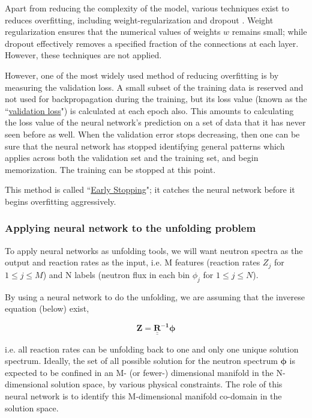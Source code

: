 \documentclass[a4paper, 12pt]{article}
\newcommand{\ve}[1]{\boldsymbol{#1}}
\begin{document}
    Apart from reducing the complexity of the model, various techniques exist to reduces overfitting, including weight-regularization and dropout \cite{TensorflowOverfitting}. Weight regularization ensures that the numerical values of weights $w$ remains small; while dropout effectively removes a specified fraction of the connections at each layer. However, these techniques are not applied.

    However, one of the most widely used method of reducing overfitting is by measuring the validation loss. A small subset of the training data is reserved and not used for backpropagation during the training, but its loss value (known as the ``\underline{validation loss}") is calculated at each epoch also. This amounts to calculating the loss value of the neural network's prediction on a set of data that it has never seen before as well. When the validation error stops decreasing, then one can be sure that the neural network has stopped identifying general patterns which applies across both the validation set and the training set, and begin memorization. The training can be stopped at this point.

    This method is called ``\underline{Early Stopping}"; it catches the neural network before it begins overfitting aggressively.

\subsubsection{Applying neural network to the unfolding problem}
    To apply neural networks as unfolding tools, we will want neutron spectra as the output and reaction rates as the input, i.e. M features (reaction rates $Z_j$ for $1\le j\le M$) and N labels (neutron flux in each bin $\phi_j$ for $1 \le j \le N$).

    By using a neural network to do the unfolding, we are assuming that the inverese equation (below) exist,

    \begin{equation} \label{unfolding inverse equation}
        \ve{Z} = \mathbf{\underline{\underline{R}}^{-1}} \ve{\phi}
    \end{equation}
    
    i.e. all reaction rates can be unfolding back to one and only one unique solution spectrum. Ideally, the set of all possible solution for the neutron spectrum $\ve{\phi}$ is expected to be confined in an M- (or fewer-) dimensional manifold in the N-dimensional solution space, by various physical constraints. The role of this neural network is to identify this M-dimensional manifold co-domain in the solution space. 
\end{document}
